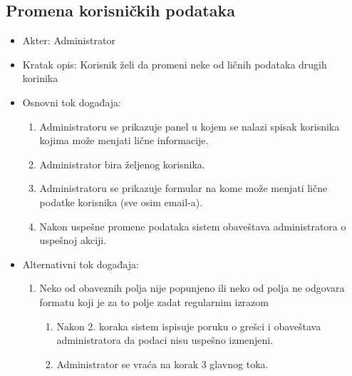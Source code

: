 \documentclass[a4paper]{article}
\begin{document}
\subsection{Promena korisničkih podataka}
\begin{itemize}
    \item Akter: Administrator
    \item Kratak opis: Korisnik želi da promeni neke od ličnih podataka drugih korinika
    \item Osnovni tok događaja:
        \begin{enumerate}
            \item Administratoru se prikazuje panel u kojem se nalazi spisak korisnika kojima može menjati lične informacije.
            \item Administrator bira željenog korisnika.
            \item Administratoru se prikazuje formular na kome može menjati lične podatke korisnika (sve osim email-a).
            \item Nakon uspešne promene podataka sistem obaveštava administratora o uspešnoj akciji.
        \end{enumerate}
    \item Alternativni tok događaja:
        \begin{enumerate}
            \item Neko od obaveznih polja nije popunjeno ili neko od polja ne odgovara formatu koji je za to polje zadat regularnim izrazom
                \begin{enumerate}
                    \item Nakon 2. koraka sistem ispisuje poruku o grešci i obaveštava administratora da podaci nisu uspešno izmenjeni.
                    \item Administrator se vraća na korak 3 glavnog toka.
                \end{enumerate}
        \end{enumerate}
\end{itemize}
\end{document}

